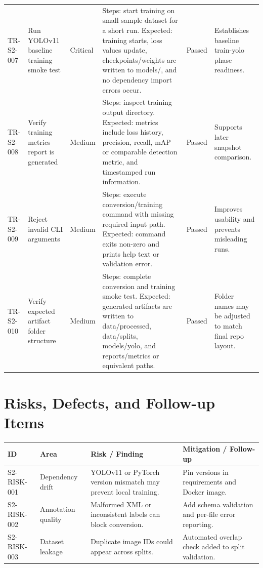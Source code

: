 \documentclass[11pt,landscape]{article}
\begin{document}
\begin{longtable}{p{0.75in}p{1.55in}p{0.65in}p{4.05in}p{0.65in}p{1.35in}}
TR-S2-007 & Run YOLOv11 baseline training smoke test & Critical & Steps: start training on small sample dataset for a short run. Expected: training starts, loss values update, checkpoints/weights are written to models/, and no dependency import errors occur. & Passed & Establishes baseline train-yolo phase readiness. \\
TR-S2-008 & Verify training metrics report is generated & Medium & Steps: inspect training output directory. Expected: metrics include loss history, precision, recall, mAP or comparable detection metric, and timestamped run information. & Passed & Supports later snapshot comparison. \\
TR-S2-009 & Reject invalid CLI arguments & Medium & Steps: execute conversion/training command with missing required input path. Expected: command exits non-zero and prints help text or validation error. & Passed & Improves usability and prevents misleading runs. \\
TR-S2-010 & Verify expected artifact folder structure & Medium & Steps: complete conversion and training smoke test. Expected: generated artifacts are written to data/processed, data/splits, models/yolo, and reports/metrics or equivalent paths. & Passed & Folder names may be adjusted to match final repo layout. \\
\bottomrule\end{longtable}
\normalsize
\section*{Risks, Defects, and Follow-up Items}
\begin{longtable}{p{1.0in}p{1.6in}p{3.8in}p{3.0in}}\toprule\textbf{ID} & \textbf{Area} & \textbf{Risk / Finding} & \textbf{Mitigation / Follow-up}\\\midrule\endhead
S2-RISK-001 & Dependency drift & YOLOv11 or PyTorch version mismatch may prevent local training. & Pin versions in requirements and Docker image. \\
S2-RISK-002 & Annotation quality & Malformed XML or inconsistent labels can block conversion. & Add schema validation and per-file error reporting. \\
S2-RISK-003 & Dataset leakage & Duplicate image IDs could appear across splits. & Automated overlap check added to split validation. \\
\bottomrule\end{longtable}
\end{document}
